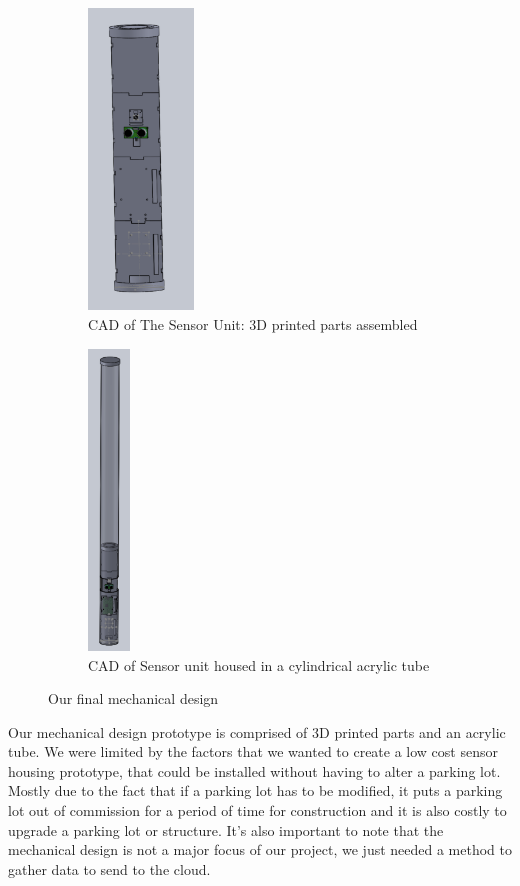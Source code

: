 \begin{figure}
\centering
\begin{subfigure}{.4\textwidth}
  \centering
  \includegraphics[width=.55\linewidth, height=8cm]{pictures/3Dprinted.png}
  \caption{CAD of The Sensor Unit: 3D printed parts assembled}
  \label{fig:CAD3dprinted}
\end{subfigure}%
\hfill
\begin{subfigure}{.4\textwidth}
  \centering
  \includegraphics[width=.2\linewidth, height=8cm]{pictures/SensorTube.png}
  \caption{CAD of Sensor unit housed in a cylindrical acrylic tube}
  \label{fig:CADacrylictube}
\end{subfigure}
\caption{Our final mechanical design}
\label{fig:finalcad}
\end{figure} 
Our mechanical design prototype is comprised of 3D printed parts and an acrylic tube. 
We were limited by the factors that we wanted to create a low cost sensor housing prototype, that could be installed without having to alter a parking lot. 
Mostly due to the fact that if a parking lot has to be modified, it puts a parking lot out of commission for a period of time for construction and it is also costly to upgrade a parking lot or structure. 
It's also important to note that the mechanical design is not a major focus of our project, we just needed a method to gather data to send to the cloud. 

